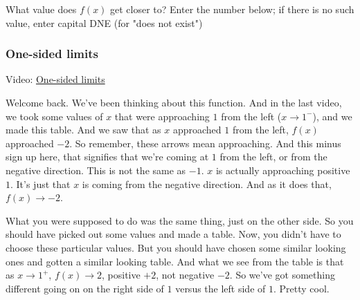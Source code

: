 \documentclass[pdftex, brazil, 12pt, twoside]{article}
\begin{document}
\begin{exercise}
  What value does $f(x)$ get closer to? Enter the number below;
  if there is no such value, enter capital DNE (for "does not exist")
\end{exercise}

\subsubsection{One-sided limits}
\label{u0-intro-one-sided}

Video: \href{https://www.youtube.com/watch?v=fAAzAVHVKQk}{One-sided limits}

Welcome back.
We've been thinking about this function.
And in the last video, we took some values
of $x$ that were approaching $1$ from the left ($x \to 1^{-}$),
and we made this table.
And we saw that as $x$ approached $1$
from the left, $f(x)$ approached $-2$.
So remember, these arrows mean approaching.
And this minus sign up here, that
signifies that we're coming at $1$ from the left,
or from the negative direction.
This is not the same as $-1$.
$x$ is actually approaching positive $1$.
It's just that $x$ is coming from the negative direction.
And as it does that, $f(x) \to -2$.

What you were supposed to do was the same thing,
just on the other side.
So you should have picked out some values and made a table.
Now, you didn't have to choose these particular values.
But you should have chosen some similar looking ones
and gotten a similar looking table.
And what we see from the table is
that as $x \to 1^{+}$,
$f(x) \to 2$, positive $+2$, not negative $-2$.
So we've got something different going on on the right side of $1$
versus the left side of $1$.
Pretty cool.

\begin{figure}[H]
  \begin{center}
    \label{fig:one-sided-limits-1}
  \end{center}
\end{figure}
\end{document}

